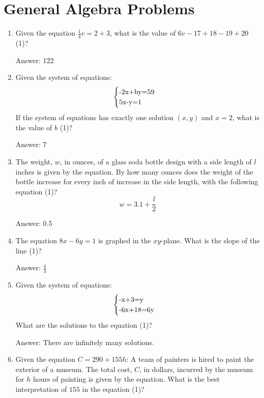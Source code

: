 \documentclass{article}
\begin{document}
\section{General Algebra Problems}

\begin{enumerate}

	\item{Given the equation $\frac{1}{4}v=2+3$, what is the value of $6v-17+18-19+20$ (1)?

	      Answer: 122}
	\item {Given the system of equations:
	      \[
		      \begin{array}{l}
			      \begin{cases}
				      $-2x+by=59$ & \\
				      $5x-y=1$
			      \end{cases}
		      \end{array}\]
	      If the system of equations has exactly one solution $(x,y)$ and $x=2$, what is the value of $b$ (1)?

	      Answer: 7
	      }
	\item {The weight, $w$, in ounces, of a glass soda bottle design with a side length of $l$ inches is given by the equation. By how many ounces does the weight of the bottle increase for every inch of increase in the side length, with the following equation (1)? \[w=3.1 + \frac{l}{2}\]

	      Answer: 0.5}

	\item {The equation $8x-6y=1$ is graphed in the $xy$-plane. What is the slope of the line (1)?

	      Answer: $\frac{4}{3}$}
	\item {Given the system of equations:
	      \[
		      \begin{array}{l}
			      \begin{cases}
				      $-x+3=y$ & \\
				      $-6x+18=6y$
			      \end{cases}
		      \end{array}\]
	      What are the solutions to the equation (1)?

	      Answer: There are infinitely many solutions.
	      }

	\item {Given the equation $C = 290+155h$: A team of painters is hired to paint the exterior of a museum. The total cost, $C$, in dollars, incurred by the museum for $h$ hours of painting is given by the equation. What is the best interpretation of $155$ in the equation (1)?

}
\end{enumerate}
\end{document}
